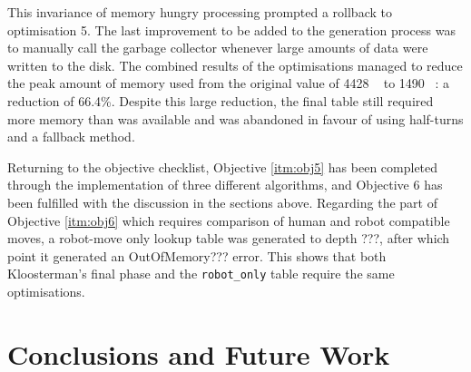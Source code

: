 \documentclass{report}
\begin{document}
    This invariance of memory hungry processing prompted a rollback to optimisation 5. The last improvement to be added to the generation process was to manually call the garbage collector whenever large amounts of data were written to the disk. The combined results of the optimisations managed to reduce the peak amount of memory used from the original value of 4428 \si{\mega\byte} to 1490 \si{\mega\byte}: a reduction of 66.4\%. Despite this large reduction, the final table still required more memory than was available and was abandoned in favour of using half-turns and a fallback method.
    
    Returning to the objective checklist, Objective \ref{itm:obj5} has been completed through the implementation of three different algorithms, and Objective 6 has been fulfilled with the discussion in the sections above. Regarding the part of Objective \ref{itm:obj6} which requires comparison of human and robot compatible moves, a robot-move only lookup table was generated to depth ???, after which point it generated an OutOfMemory??? error. This shows that both Kloosterman's final phase and the \lstinline|robot_only| table require the same optimisations.
    
     
    \newpage
    \chapter{Conclusions and Future Work}
    
    
\end{document}
